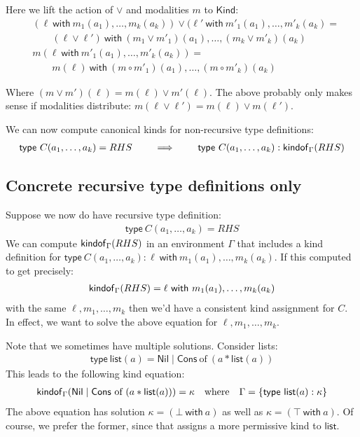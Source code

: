 \documentclass{article}
\newcommand{\type}{\mathsf{type\ }}
\newcommand{\Kind}{\mathsf{Kind}}
\newcommand{\with}{\mathsf{\ with\ }}
\begin{document}
Here we lift the action of $\vee$ and modalities $m$ to $\Kind$:
\begin{align*}
    &(\ell \with m_1(a_1),\dots,m_k(a_k)) \vee (\ell' \with m'_1(a_1),\dots,m'_k(a_k) =\\
    &\qquad (\ell \vee \ell') \with (m_1 \vee m'_1)(a_1),\dots,(m_k \vee m'_k)(a_k)\\
    &m(\ell \with m'_1(a_1),\dots,m'_k(a_k)) =\\
    &\qquad m(\ell) \with (m \circ m'_1)(a_1),\dots,(m \circ m'_k)(a_k)
\end{align*}

Where $(m \vee m')(\ell) = m(\ell) \vee m'(\ell)$. The above probably only makes sense if modalities distribute: $m(\ell \vee \ell') = m(\ell) \vee m(\ell')$.

We can now compute canonical kinds for non-recursive type definitions:
\begin{align*}
    \type C(a_1, \dots, a_k) = RHS \qquad \implies \qquad \type C(a_1, \dots, a_k) : \kindof(RHS)
\end{align*}

\subsection{Concrete recursive type definitions only}

Suppose we now do have recursive type definition:
\begin{align*}
    \type C(a_1, \dots, a_k) = RHS
\end{align*}
We can compute $\mathsf{kindof}_\Gamma(RHS)$ in an environment $\Gamma$ that includes a kind definition for $\type C(a_1, \dots, a_k) : \ell \with m_1(a_1),\dots,m_k(a_k)$.
If this computed to get precisely:
\begin{align*}
    \kindof(RHS) = \ell \with m_1(a_1),\dots,m_k(a_k)
\end{align*}
with the same $\ell,m_1,\dots,m_k$ then we'd have a consistent kind assignment for $C$.
In effect, we want to solve the above equation for $\ell,m_1,\dots,m_k$.

Note that we sometimes have multiple solutions. Consider lists:
\begin{align*}
    \type \mathsf{list}(a) = \mathsf{Nil} \mid \mathsf{Cons}\ \text{of}\ (a \ast \mathsf{list}(a))
\end{align*}
This leads to the following kind equation:
\begin{align*}
    \kindof(\mathsf{Nil} \mid \mathsf{Cons}\ \text{of}\ (a \ast \mathsf{list}(a))) = \kappa \text{\quad where\quad} \Gamma = \{ \type \mathsf{list}(a) : \kappa \}
\end{align*}
The above equation has solution $\kappa = (\bot \with a)$ as well as $\kappa = (\top \with a)$.
Of course, we prefer the former, since that assigns a more permissive kind to $\mathsf{list}$.
\end{document}
